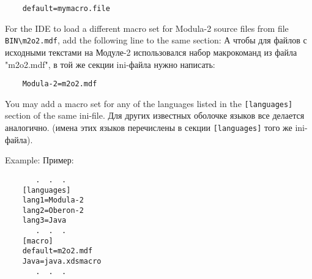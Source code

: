 \verb'    default=mymacro.file'

\ifenglish
For the IDE to load a different macro set for Modula-2 source files
from file \verb'BIN\m2o2.mdf', add the following line to the same section:
\else  
А чтобы для файлов с исходными текстами на Модуле-2 использовался 
набор макрокоманд из файла "m2o2.mdf", в той же секции ini-файла нужно написать:
\fi

\verb'    Modula-2=m2o2.mdf'

\ifenglish
You may add a macro set for any of the languages listed in 
the \verb'[languages]' section of the same ini-file.
\else  
Для других известных оболочке языков все делается аналогично.
(имена этих языков перечислены в секции \verb'[languages]' того же ini-файла).
\fi

\ifenglish
Example:
\else  
Пример:
\fi

\begin{verbatim}
       .  .  .
    [languages]
    lang1=Modula-2
    lang2=Oberon-2
    lang3=Java
       .  .  .
    [macro]
    default=m2o2.mdf
    Java=java.xdsmacro
       .  .  .
\end{verbatim}



